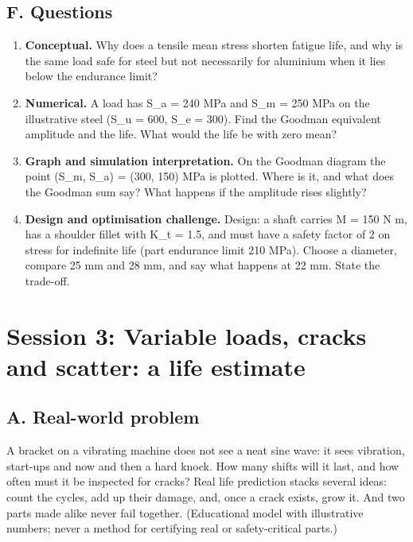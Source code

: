 \documentclass[11pt,a4paper]{article}
\begin{document}
\subsection*{F. Questions}
\begin{enumerate}[nosep]
\item \textbf{Conceptual.} Why does a tensile mean stress shorten fatigue life, and why is the same load safe for steel but not necessarily for aluminium when it lies below the endurance limit?
\item \textbf{Numerical.} A load has S\_a = 240 MPa and S\_m = 250 MPa on the illustrative steel (S\_u = 600, S\_e = 300). Find the Goodman equivalent amplitude and the life. What would the life be with zero mean?
\item \textbf{Graph and simulation interpretation.} On the Goodman diagram the point (S\_m, S\_a) = (300, 150) MPa is plotted. Where is it, and what does the Goodman sum say? What happens if the amplitude rises slightly?
\item \textbf{Design and optimisation challenge.} Design: a shaft carries M = 150 N m, has a shoulder fillet with K\_t = 1.5, and must have a safety factor of 2 on stress for indefinite life (part endurance limit 210 MPa). Choose a diameter, compare 25 mm and 28 mm, and say what happens at 22 mm. State the trade-off.
\end{enumerate}

\section{Session 3: Variable loads, cracks and scatter: a life estimate}

\subsection*{A. Real-world problem}
A bracket on a vibrating machine does not see a neat sine wave: it sees vibration, start-ups and now and then a hard knock. How many shifts will it last, and how often must it be inspected for cracks? Real life prediction stacks several ideas: count the cycles, add up their damage, and, once a crack exists, grow it. And two parts made alike never fail together. (Educational model with illustrative numbers; never a method for certifying real or safety-critical parts.)
\end{document}

